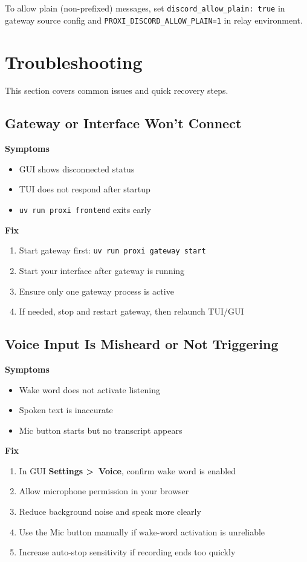 \documentclass{article}
\begin{document}
To allow plain (non-prefixed) messages, set \texttt{discord\_allow\_plain: true} in gateway source config and \texttt{PROXI\_DISCORD\_ALLOW\_PLAIN=1} in relay environment.

\section{Troubleshooting}

This section covers common issues and quick recovery steps.

\subsection{Gateway or Interface Won't Connect}

\textbf{Symptoms}
\begin{itemize}
\item GUI shows disconnected status
\item TUI does not respond after startup
\item \texttt{uv run proxi frontend} exits early
\end{itemize}

\textbf{Fix}
\begin{enumerate}
\item Start gateway first: \texttt{uv run proxi gateway start}
\item Start your interface after gateway is running
\item Ensure only one gateway process is active
\item If needed, stop and restart gateway, then relaunch TUI/GUI
\end{enumerate}

\subsection{Voice Input Is Misheard or Not Triggering}

\textbf{Symptoms}
\begin{itemize}
\item Wake word does not activate listening
\item Spoken text is inaccurate
\item Mic button starts but no transcript appears
\end{itemize}

\textbf{Fix}
\begin{enumerate}
\item In GUI \textbf{Settings \textgreater\ Voice}, confirm wake word is enabled
\item Allow microphone permission in your browser
\item Reduce background noise and speak more clearly
\item Use the Mic button manually if wake-word activation is unreliable
\item Increase auto-stop sensitivity if recording ends too quickly
\end{enumerate}
\end{document}
